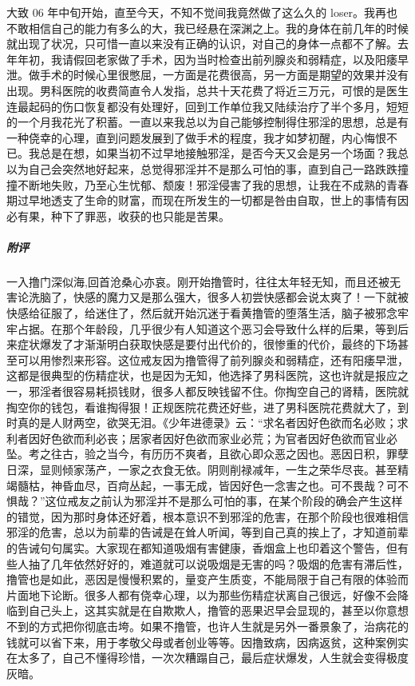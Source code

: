 \begin{case}
    大致 06 年中旬开始，直至今天，不知不觉间我竟然做了这么久的 loser。我再也不敢相信自己的能力有多么的大，我已经悬在深渊之上。我的身体在前几年的时候就出现了状况，只可惜一直以来没有正确的认识，对自己的身体一点都不了解。去年年初，我请假回老家做了手术，因为当时检查出前列腺炎和弱精症，以及阳痿早泄。做手术的时候心里很憋屈，一方面是花费很高，另一方面是期望的效果并没有出现。男科医院的收费简直令人发指，总共十天花费了将近三万元，可恨的是医生连最起码的伤口恢复都没有处理好，回到工作单位我又陆续治疗了半个多月，短短的一个月我花光了积蓄。一直以来我总以为自己能够控制得住邪淫的思想，总是有一种侥幸的心理，直到问题发展到了做手术的程度，我才如梦初醒，内心悔恨不已。我总是在想，如果当初不过早地接触邪淫，是否今天又会是另一个场面？我总以为自己会突然地好起来，总觉得邪淫并不是那么可怕的事，直到自己一路跌跌撞撞不断地失败，乃至心生忧郁、颓废！邪淫侵害了我的思想，让我在不成熟的青春期过早地透支了生命的财富，而现在所发生的一切都是咎由自取，世上的事情有因必有果，种下了罪恶，收获的也只能是苦果。
    \subparagraph{附评} 一入撸门深似海,回首沧桑心亦哀。刚开始撸管时，往往太年轻无知，而且还被无害论洗脑了，快感的魔力又是那么强大，很多人初尝快感都会说太爽了！一下就被快感给征服了，给迷住了，然后就开始沉迷于看黄撸管的堕落生活，脑子被邪念牢牢占据。在那个年龄段，几乎很少有人知道这个恶习会导致什么样的后果，等到后来症状爆发了才渐渐明白获取快感是要付出代价的，很惨重的代价，最终的下场甚至可以用惨烈来形容。这位戒友因为撸管得了前列腺炎和弱精症，还有阳痿早泄，这都是很典型的伤精症状，也是因为无知，他选择了男科医院，这也许就是报应之一，邪淫者很容易耗损钱财，很多人都反映钱留不住。你掏空自己的肾精，医院就掏空你的钱包，看谁掏得狠！正规医院花费还好些，进了男科医院花费就大了，到时真的是人财两空，欲哭无泪。《少年进德录》云：“求名者因好色欲而名必败；求利者因好色欲而利必丧；居家者因好色欲而家业必荒；为官者因好色欲而官业必坠。考之往古，验之当今，有历历不爽者，且欲心即众恶之因也。恶因日积，罪孽日深，显则倾家荡产，一家之衣食无依。阴则削禄减年，一生之荣华尽丧。甚至精竭髓枯，神昏血尽，百疴丛起，一事无成，皆因好色一念害之也。可不畏哉？可不惧哉？”这位戒友之前认为邪淫并不是那么可怕的事，在某个阶段的确会产生这样的错觉，因为那时身体还好着，根本意识不到邪淫的危害，在那个阶段也很难相信邪淫的危害，总以为前辈的告诫是在耸人听闻，等到自己真的挨上了，才知道前辈的告诫句句属实。大家现在都知道吸烟有害健康，香烟盒上也印着这个警告，但有些人抽了几年依然好好的，难道就可以说吸烟是无害的吗？吸烟的危害有滞后性，撸管也是如此，恶因是慢慢积累的，量变产生质变，不能局限于自己有限的体验而片面地下论断。很多人都有侥幸心理，以为那些伤精症状离自己很远，好像不会降临到自己头上，这其实就是在自欺欺人，撸管的恶果迟早会显现的，甚至以你意想不到的方式把你彻底击垮。如果不撸管，也许人生就是另外一番景象了，治病花的钱就可以省下来，用于孝敬父母或者创业等等。因撸致病，因病返贫，这种案例实在太多了，自己不懂得珍惜，一次次糟蹋自己，最后症状爆发，人生就会变得极度灰暗。
\end{case}


